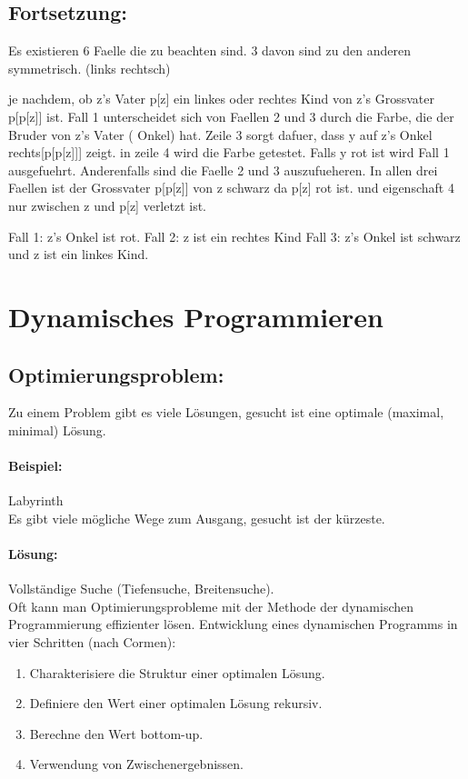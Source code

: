 \documentclass[a4paper,twoside,DIV15,BCOR12mm]{scrbook}
\begin{document}
\subsection*{Fortsetzung: }
Es existieren 6 Faelle die zu beachten sind. 
3 davon sind zu den anderen symmetrisch. (links rechtsch)

je nachdem, ob z's Vater p[z] ein linkes oder rechtes Kind von z's Grossvater p[p[z]] ist.
Fall 1 unterscheidet sich von Faellen 2 und 3 durch die Farbe, die der Bruder von z's Vater ( Onkel) hat. Zeile 3 sorgt dafuer, dass y auf z's Onkel rechts[p[p[z]]] zeigt. in zeile 4 wird die Farbe getestet. Falls y rot ist wird Fall 1 ausgefuehrt.
Anderenfalls sind die Faelle 2 und 3 auszufueheren. In allen drei Faellen ist der Grossvater p[p[z]] von z schwarz da p[z] rot ist. und eigenschaft 4 nur zwischen z und p[z] verletzt ist. 


Fall 1: z's Onkel ist rot.
Fall 2: z ist ein rechtes Kind
Fall 3: z's Onkel ist schwarz und z ist ein linkes Kind.




\section{Dynamisches Programmieren}
\subsection{Optimierungsproblem:} Zu einem Problem gibt es viele Lösungen, gesucht ist eine optimale (maximal, minimal) Lösung.
\paragraph{Beispiel:} Labyrinth\\
Es gibt viele mögliche Wege zum Ausgang, gesucht ist der kürzeste.
\paragraph{Lösung:} Vollständige Suche (Tiefensuche, Breitensuche).\\
Oft kann man Optimierungsprobleme mit der Methode der dynamischen Programmierung effizienter lösen. Entwicklung eines dynamischen Programms in vier Schritten (nach Cormen):
\begin{enumerate}
\item Charakterisiere die Struktur einer optimalen Lösung.
\item Definiere den Wert einer optimalen Lösung rekursiv.
\item Berechne den Wert \glqq bottom-up\grqq .
\item Verwendung von Zwischenergebnissen.
\end{enumerate}
\end{document}
